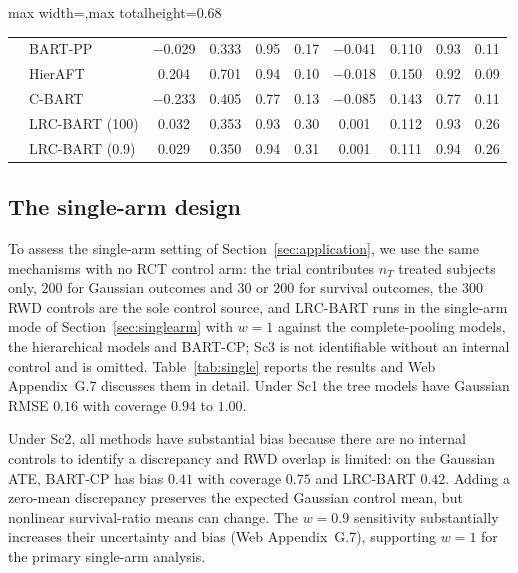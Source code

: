 \documentclass[11pt]{article}
\theoremstyle{definition}
\theoremstyle{plain}
\begin{document}
\begin{table}[htbp]
\begin{adjustbox}{max width=\textwidth,max totalheight=0.68\textheight}
\begin{tabular}{llcccccccc}
& BART-PP & $-$0.029 & 0.333 & 0.95 & 0.17 & $-$0.041 & 0.110 & 0.93 & 0.11 \\
& HierAFT & 0.204 & 0.701 & 0.94 & 0.10 & $-$0.018 & 0.150 & 0.92 & 0.09 \\
& C-BART & $-$0.233 & 0.405 & 0.77 & 0.13 & $-$0.085 & 0.143 & 0.77 & 0.11 \\
& LRC-BART (100) & 0.032 & 0.353 & 0.93 & 0.30 & 0.001 & 0.112 & 0.93 & 0.26 \\
& LRC-BART (0.9) & 0.029 & 0.350 & 0.94 & 0.31 & 0.001 & 0.111 & 0.94 & 0.26 \\
\bottomrule
\end{tabular}
\end{adjustbox}
\end{table}


\subsection{The single-arm design}
\label{sec:sim_single}

To assess the single-arm setting of Section~\ref{sec:application}, we use the same mechanisms with no RCT control arm: the trial contributes $n_T$ treated subjects only, $200$ for Gaussian outcomes and $30$ or $200$ for survival outcomes, the $300$ RWD controls are the sole control source, and LRC-BART runs in the single-arm mode of Section~\ref{sec:singlearm} with $w=1$ against the complete-pooling models, the hierarchical models and BART-CP; Sc3 is not identifiable without an internal control and is omitted. Table~\ref{tab:single} reports the results and Web Appendix~G.7 discusses them in detail. Under Sc1 the tree models have Gaussian RMSE $0.16$ with coverage $0.94$ to $1.00$.

Under Sc2, all methods have substantial bias because there are no internal controls to identify a discrepancy and RWD overlap is limited: on the Gaussian ATE, BART-CP has bias $0.41$ with coverage $0.75$ and LRC-BART $0.42$. Adding a zero-mean discrepancy preserves the expected Gaussian control mean, but nonlinear survival-ratio means can change. The $w=0.9$ sensitivity substantially increases their uncertainty and bias (Web Appendix~G.7), supporting $w=1$ for the primary single-arm analysis.
\end{document}

